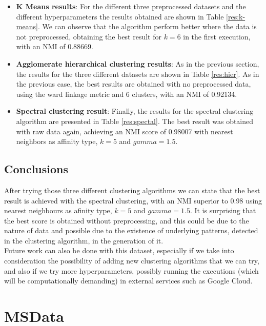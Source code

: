 \documentclass[12pt]{article}
\begin{document}
\begin{itemize}
    \item \textbf{K Means results}: For the different three preprocessed datasets and the different hyperparameters the results obtained are shown in Table \ref{res:k-means}. We can observe that the algorithm perform better where the data is not preprocessed, obtaining the best result for $k=6$ in the first execution, with an NMI of 0.88669.
    \item \textbf{Agglomerate hierarchical clustering results}: As in the previous section, the results for the three different datasets are shown in Table \ref{res:hier}. As in the previous case, the best results are obtained with no preprocessed data, using the ward linkage metric and 6 clusters, with an NMI of 0.92134.
    \item \textbf{Spectral clustering result}: Finally, the results for the spectral clustering algorithm are presented in Table \ref{res:spectal}. The best result was obtained with raw data again, achieving an NMI score of 0.98007 with nearest neighbors as affinity type, $k=5$ and $gamma = 1.5$.
\end{itemize}

\subsection{Conclusions}

After trying those three different clustering algorithms we can state that the best result is achieved with the spectral clustering, with an NMI superior to 0.98 using nearest neighbours as afinity type, $k=5$ and $gamma = 1.5$. It is surprising that the best score is obtained without preprocessing, and this could be due to the nature of data and possible due to the existence of underlying patterns, detected in the clustering algorithm, in the generation of it. \\

Future work can also be done with this dataset, especially if we take into consideration the possibility of adding new clustering algorithms that we can try, and also if we try more hyperparameters, possibly running the executions (which will be computationally demanding) in external services such as Google Cloud.

\section{MSData}
\end{document}
